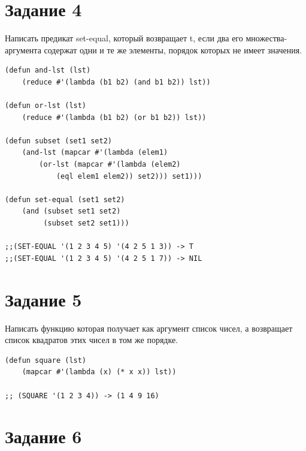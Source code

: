 \documentclass[a4paper,14pt, unknownkeysallowed]{extreport}
\begin{document}
\clearpage

\section{Задание 4}

Написать предикат set-equal, который возвращает t, если два его множества-аргумента содержат одни и те же элементы, порядок которых не имеет значения.

\begin{center}
\captionsetup{justification=raggedright,singlelinecheck=off}
\begin{lstlisting}[label=lst:parallel_processing,caption=Решение задания 4]
(defun and-lst (lst)
    (reduce #'(lambda (b1 b2) (and b1 b2)) lst))

(defun or-lst (lst)
    (reduce #'(lambda (b1 b2) (or b1 b2)) lst))

(defun subset (set1 set2)
    (and-lst (mapcar #'(lambda (elem1) 
        (or-lst (mapcar #'(lambda (elem2) 
            (eql elem1 elem2)) set2))) set1)))

(defun set-equal (set1 set2)
    (and (subset set1 set2)
         (subset set2 set1)))

;;(SET-EQUAL '(1 2 3 4 5) '(4 2 5 1 3)) -> T
;;(SET-EQUAL '(1 2 3 4 5) '(4 2 5 1 7)) -> NIL
\end{lstlisting}
\end{center}

\section{Задание 5}

Написать функцию которая получает как аргумент список чисел, а возвращает список квадратов этих чисел в том же порядке.

\begin{center}
\captionsetup{justification=raggedright,singlelinecheck=off}
\begin{lstlisting}[label=lst:parallel_processing,caption=Решение задания 5]
(defun square (lst)
    (mapcar #'(lambda (x) (* x x)) lst))

;; (SQUARE '(1 2 3 4)) -> (1 4 9 16)
\end{lstlisting}
\end{center}

\section{Задание 6}
\end{document}
